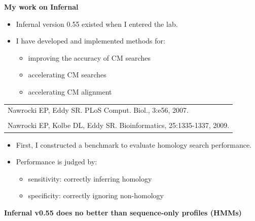 \documentclass[landscape]{slides}
\begin{document}
\begin{slide}
\begin{center}

\textbf{My work on Infernal}
\medskip

\small 
\begin{itemize}
\item Infernal version 0.55 existed when I entered the lab.

\item I have developed and implemented methods for:

\begin{itemize}
\item improving the accuracy of CM searches
\item accelerating CM searches
\item accelerating CM alignment
\end{itemize}
\end{itemize}

\begin{tabular}{l}
Nawrocki EP, Eddy SR. PLoS Comput. Biol., 3:e56, 2007. \\
\\
Nawrocki EP, Kolbe DL, Eddy SR. Bioinformatics, 25:1335-1337, 2009. \\
\end{tabular}
\end{center}

\bigskip

\small 
\begin{itemize}
\item First, I constructed a benchmark to evaluate homology search performance.

\item Performance is judged by:
  \begin{itemize}
    \item sensitivity: correctly inferring homology 
    \item specificity: correctly ignoring non-homology 
  \end{itemize}
\end{itemize}

\vfill 
\end{slide}
\begin{slide}
\begin{center}

\textbf{Infernal v0.55 does no better than sequence-only profiles (HMMs)}
\end{center}
\medskip


\vfill 
\end{slide}
\end{document}
